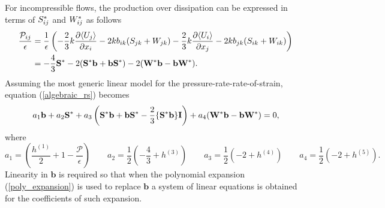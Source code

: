 \documentclass[oneside,a4paper,11pt]{report}
\begin{document}
For incompressible flows, the production over dissipation can be expressed in terms of $S^*_{ij}$ and $W^*_{ij}$ as follows
\begin{align}
\frac{\mathcal{P}_{ij}}{\epsilon} &= \frac{1}{\epsilon} \left (-\frac{2}{3} k \frac{\partial \langle U_j \rangle}{\partial x_i} - 2kb_{ik}(S_{jk} + W_{jk}) - \frac{2}{3} k \frac{\partial \langle U_i \rangle}{\partial x_j} - 2kb_{jk}(S_{ik} + W_{ik}) \right ) \nonumber \\
& = -\frac{4}{3} \mathbf{S^*} - 2( \mathbf{S^*} \mathbf{b} + \mathbf{b} \mathbf{S^*}) - 2 (\mathbf{W^*} \mathbf{b} - \mathbf{b} \mathbf{W^*} ).
\end{align}
Assuming the most generic linear model for the pressure-rate-rate-of-strain, equation (\ref{algebraic_rs}) becomes
\begin{equation}
a_1 \mathbf{b} + a_2 \mathbf{S^*} + a_3 \left (\mathbf{S^*} \mathbf{b} + \mathbf{b} \mathbf{S^*} - \frac{2}{3} \{ \mathbf{S^*} \mathbf{b} \} \mathbf{I} \right) + a_4 (\mathbf{W^*} \mathbf{b} - \mathbf{b} \mathbf{W^*}) = 0,
\end{equation}
where
\begin{equation}
a_1 = \left ( \frac{h^{(1)}}{2} +1 - \frac{\mathcal{P}}{\epsilon} \right ) \qquad a_2 = \frac{1}{2} \left (-\frac{4}{3} + h^{(3)} \right ) \qquad a_3 = \frac{1}{2} \left (-2 + h^{(4)} \right ) \qquad a_4 = \frac{1}{2} \left (-2 + h^{(5)} \right ).
\end{equation}
Linearity in $\mathbf{b}$ is required so that when the polynomial expansion (\ref{poly_expansion}) is used to replace $\mathbf{b}$ a system of linear equations is obtained for the coefficients of such expansion.
\end{document}
